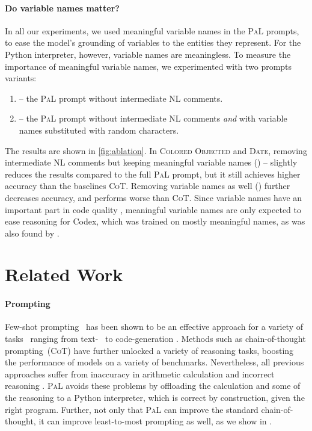 \documentclass[dvipsnames]{article} \usepackage[accepted]{icml2022}
\newcommand{\ours}{\textsc{PaL}\xspace}
\newcommand{\cotp}{\textsc{CoT}\xspace}
\begin{document}
\paragraph{Do variable names matter?} In all our experiments, we used meaningful variable names in the \ours prompts, to ease the model's grounding of variables to the entities they represent.
For the Python interpreter, however, variable names are meaningless.
To measure the importance of meaningful variable names, we experimented with two prompts variants:
\begin{enumerate}
    \item  -- the \ours prompt without intermediate NL comments.
    \item  -- the \ours prompt without intermediate NL comments \emph{and} with variable names substituted with random characters.
\end{enumerate}


The results are shown in \autoref{fig:ablation}. 
In \textsc{Colored Objected} and \textsc{Date}, 
removing intermediate NL comments but keeping meaningful variable names () -- slightly reduces the results compared to the full \ours prompt, but it still achieves higher accuracy than the baselines \cotp. Removing variable names as well () further decreases  accuracy, and performs worse than \cotp. Since variable names have an important part in code quality \citep{gellenbeck1991investigation, takang1996effects}, meaningful variable names are only expected to ease reasoning for Codex, which was trained on mostly meaningful names, as was also found by \citet{cocogen}.





 
\section{Related Work}
\label{sec:extended_related_work}
\paragraph{Prompting}
Few-shot prompting~\cite{brown2020language} has been shown to be an effective approach for a variety of tasks~\citep{liu2021pre} ranging from text-~\citep{gem,reif2021recipe,flan,bigscience} to code-generation \citep{chen_evaluating_2021}. 
Methods such as chain-of-thought prompting~(\cotp) have further unlocked a variety of reasoning tasks, boosting the performance of models on a variety of benchmarks.
Nevertheless, all previous approaches suffer from inaccuracy in arithmetic calculation and incorrect reasoning \citep{minerva,hendrycks2021measuring,cotanalysis2022}.  \ours avoids these problems by offloading the calculation and some of the reasoning to a Python interpreter, which is correct by construction, given the right program.
Further, not only that \ours can improve the standard chain-of-thought, it can improve least-to-most prompting \citep{zhou2022least} as well, as we show in .
\end{document}
